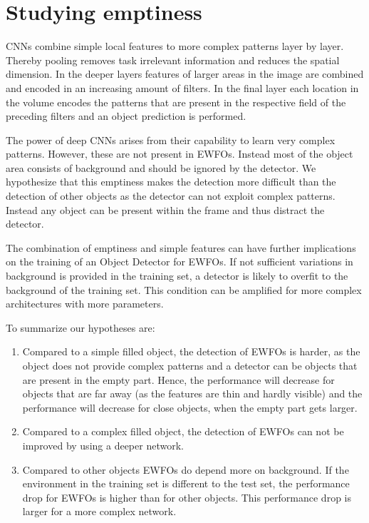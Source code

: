 \section{Studying emptiness}

\acp{CNN} combine simple local features to more complex patterns layer by layer. Thereby pooling removes task irrelevant information and reduces the spatial dimension. In the deeper layers features of larger areas in the image are combined and encoded in an increasing amount of filters. In the final layer each location in the volume encodes the patterns that are present in the respective field of the preceding filters and an object prediction is performed.

The power of deep \acp{CNN} arises from their capability to learn very complex patterns. However, these are not present in \acp{EWFO}. Instead most of the object area consists of background and should be ignored by the detector. We hypothesize that this emptiness makes the detection more difficult than the detection of other objects as the detector can not exploit complex patterns. Instead any object can be present within the frame and thus distract the detector.

The combination of emptiness and simple features can have further implications on the training of an Object Detector for \acp{EWFO}. If not sufficient variations in background is provided in the training set, a detector is likely to overfit to the background of the training set. This condition can be amplified for more complex architectures with more parameters.

To summarize our hypotheses are:
\begin{enumerate}
	\item Compared to a simple filled object, the detection of \acp{EWFO} is harder, as the object does not provide complex patterns and a detector can be objects that are present in the empty part. Hence, the performance will decrease for objects that are far away (as the features are thin and hardly visible) and the performance will decrease for close objects, when the empty part gets larger.
	\item Compared to a complex filled object, the detection of \acp{EWFO} can not be improved by using a deeper network.
	\item Compared to other objects \acp{EWFO} do depend more on background. If the environment in the training set is different to the test set, the performance drop for \acp{EWFO} is higher than for other objects. This performance drop is larger for a more complex network.
\end{enumerate}

